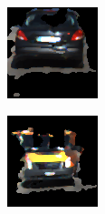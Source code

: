 \begin{figure}[h!]
    \centering
    \begin{subfigure}[c]{0.3\textwidth}
        \includegraphics[width=\textwidth]{../Material/texture222_0.png}
        \label{fig:eval:texture:222_0}
    \end{subfigure}
    \begin{subfigure}[c]{0.3\textwidth}
        \includegraphics[width=\textwidth]{../Material/texture222_1.png}

\end{subfigure}
\end{figure}
